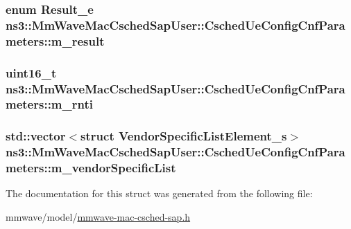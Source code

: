\subsubsection[{\texorpdfstring{m\+\_\+result}{m_result}}]{\setlength{\rightskip}{0pt plus 5cm}enum {\bf Result\+\_\+e} ns3\+::\+Mm\+Wave\+Mac\+Csched\+Sap\+User\+::\+Csched\+Ue\+Config\+Cnf\+Parameters\+::m\+\_\+result}\hypertarget{structns3_1_1MmWaveMacCschedSapUser_1_1CschedUeConfigCnfParameters_a7803ea48afb22e35bf82c66cfcc0ae8b}{}\label{structns3_1_1MmWaveMacCschedSapUser_1_1CschedUeConfigCnfParameters_a7803ea48afb22e35bf82c66cfcc0ae8b}
\subsubsection[{\texorpdfstring{m\+\_\+rnti}{m_rnti}}]{\setlength{\rightskip}{0pt plus 5cm}uint16\+\_\+t ns3\+::\+Mm\+Wave\+Mac\+Csched\+Sap\+User\+::\+Csched\+Ue\+Config\+Cnf\+Parameters\+::m\+\_\+rnti}\hypertarget{structns3_1_1MmWaveMacCschedSapUser_1_1CschedUeConfigCnfParameters_a7c7eeb5c84a52140c8d0a322b8e5ffbc}{}\label{structns3_1_1MmWaveMacCschedSapUser_1_1CschedUeConfigCnfParameters_a7c7eeb5c84a52140c8d0a322b8e5ffbc}
\subsubsection[{\texorpdfstring{m\+\_\+vendor\+Specific\+List}{m_vendorSpecificList}}]{\setlength{\rightskip}{0pt plus 5cm}std\+::vector$<$struct {\bf Vendor\+Specific\+List\+Element\+\_\+s}$>$ ns3\+::\+Mm\+Wave\+Mac\+Csched\+Sap\+User\+::\+Csched\+Ue\+Config\+Cnf\+Parameters\+::m\+\_\+vendor\+Specific\+List}\hypertarget{structns3_1_1MmWaveMacCschedSapUser_1_1CschedUeConfigCnfParameters_a1c0619edf45e2f692a5ae4ffbf8084b5}{}\label{structns3_1_1MmWaveMacCschedSapUser_1_1CschedUeConfigCnfParameters_a1c0619edf45e2f692a5ae4ffbf8084b5}


The documentation for this struct was generated from the following file\+:\begin{DoxyCompactItemize}
\item 
mmwave/model/\hyperlink{mmwave-mac-csched-sap_8h}{mmwave-\/mac-\/csched-\/sap.\+h}\end{DoxyCompactItemize}
